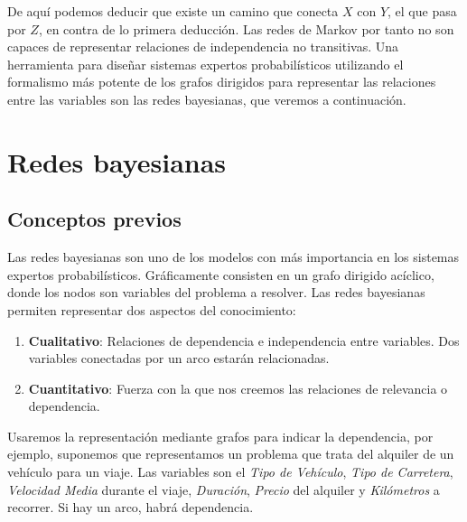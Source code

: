 \documentclass{article}
\theoremstyle{definition_wo_parentheses}
\begin{document}
\begin{enumerate}
\begin{center}
\end{center}

De aquí podemos deducir que existe un camino que conecta $X$ con $Y$, el que pasa por $Z$, en contra de lo primera deducción. Las redes de Markov por tanto no son capaces de representar relaciones de independencia no transitivas. Una herramienta para diseñar sistemas expertos probabilísticos utilizando el formalismo más potente de los grafos dirigidos para representar las relaciones entre las variables son las redes bayesianas, que veremos a continuación.
\end{enumerate}

\section{Redes bayesianas}

\subsection{Conceptos previos}

Las redes bayesianas son uno de los modelos con más importancia en los sistemas expertos probabilísticos. Gráficamente consisten en un grafo dirigido acíclico, donde los nodos son variables del problema a resolver. Las redes bayesianas permiten representar dos aspectos del conocimiento:

\begin{enumerate}
\item \textbf{Cualitativo}: Relaciones de dependencia e independencia entre variables. Dos variables conectadas por un arco estarán relacionadas.
\item \textbf{Cuantitativo}: Fuerza con la que nos creemos las relaciones de relevancia o dependencia.
\end{enumerate}

Usaremos la representación mediante grafos para indicar la dependencia, por ejemplo, suponemos que representamos un problema que trata del alquiler de un vehículo para un viaje. Las variables son el \textit{Tipo de Vehículo}, \textit{Tipo de Carretera}, \textit{Velocidad Media} durante el viaje, \textit{Duración}, \textit{Precio} del alquiler y \textit{Kilómetros} a recorrer. Si hay un arco, habrá dependencia. 

\begin{center}
\end{center}
\end{document}
